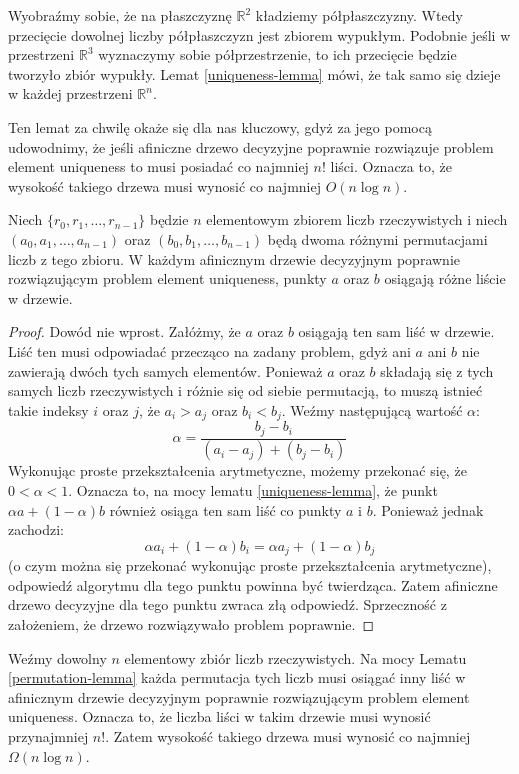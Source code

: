 Wyobraźmy sobie, że na płaszczyznę $\mathbb{R}^2$ kładziemy półpłaszczyzny.
Wtedy przecięcie dowolnej liczby półpłaszczyzn jest zbiorem wypukłym.
Podobnie jeśli w przestrzeni $\mathbb{R}^3$ wyznaczymy sobie półprzestrzenie, to ich przecięcie będzie tworzyło zbiór wypukły.
Lemat \ref{uniqueness-lemma} mówi, że tak samo się dzieje w każdej przestrzeni $\mathbb{R}^n$.

Ten lemat za chwilę okaże się dla nas kluczowy, gdyż za jego pomocą udowodnimy, że jeśli afiniczne drzewo decyzyjne poprawnie rozwiązuje problem element uniqueness to musi posiadać co najmniej $n!$ liści.
Oznacza to, że wysokość takiego drzewa musi wynosić co najmniej $O(n \log n)$.

\begin{lemma}
 \label{permutation-lemma}
 Niech $\{r_0, r_1, \ldots, r_{n-1}\}$ będzie $n$ elementowym zbiorem liczb rzeczywistych i niech $(a_0, a_1, \ldots, a_{n-1})$ oraz $(b_0, b_1, \ldots, b_{n-1})$ będą dwoma różnymi permutacjami liczb z tego zbioru.
 W każdym afinicznym drzewie decyzyjnym poprawnie rozwiązującym problem element uniqueness, punkty $a$ oraz $b$ osiągają różne liście w drzewie.
\end{lemma}

\begin{proof}
 Dowód nie wprost.
 Załóżmy, że $a$ oraz $b$ osiągają ten sam liść w drzewie.
 Liść ten musi odpowiadać przecząco na zadany problem, gdyż ani $a$ ani $b$ nie zawierają dwóch tych samych elementów.
 Ponieważ $a$ oraz $b$ składają się z tych samych liczb rzeczywistych i różnie się od siebie permutacją, to muszą istnieć takie indeksy $i$ oraz $j$, że $a_i > a_j$ oraz $b_i < b_j$.
 Weźmy następującą wartość $\alpha$:
 \[
  \alpha = \frac{b_j - b_i}{(a_i - a_j) + (b_j - b_i)}
 \]
 Wykonując proste przekształcenia arytmetyczne, możemy przekonać się, że $0 < \alpha < 1$.
 Oznacza to, na mocy lematu \ref{uniqueness-lemma}, że punkt $\alpha a + (1 - \alpha)b$ również osiąga ten sam liść co punkty $a$ i $b$.
 Ponieważ jednak zachodzi:
 \[
  \alpha a_i + (1 - \alpha) b_i = \alpha a_j + (1 - \alpha) b_j
 \]
 (o czym można się przekonać wykonując proste przekształcenia arytmetyczne), odpowiedź algorytmu dla tego punktu powinna być twierdząca.
 Zatem afiniczne drzewo decyzyjne dla tego punktu zwraca złą odpowiedź.
 Sprzeczność z założeniem, że drzewo rozwiązywało problem poprawnie.
\end{proof}

Weźmy dowolny $n$ elementowy zbiór liczb rzeczywistych.
Na mocy Lematu \ref{permutation-lemma} każda permutacja tych liczb musi osiągać inny liść w afinicznym drzewie decyzyjnym poprawnie rozwiązującym problem element uniqueness.
Oznacza to, że liczba liści w takim drzewie musi wynosić przynajmniej $n!$.
Zatem wysokość takiego drzewa musi wynosić co najmniej $\Omega(n \log n)$.